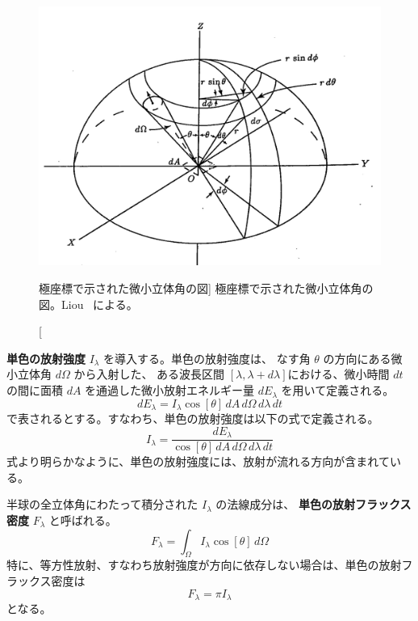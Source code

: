 \documentclass[book]{dennou777}
\newcommand{\hmemph}[1]{\textbf{#1}}
\begin{document}
\begin{figure}[t]
	\includegraphics[width=\linewidth]{eq2.jpg}
	\caption
	[極座標で示された微小立体角の図]
	{極座標で示された微小立体角の図。Liou~\cite{liou} による。}
\end{figure}

\hmemph{単色の放射強度} \(I_\lambda\) を導入する。単色の放射強度は、
なす角 \(\theta\) の方向にある微小立体角 \(d\Omega\) から入射した、
ある波長区間 \([\lambda,\lambda+d\lambda]\)における、微小時間 \(dt\)
の間に面積 \(dA\) を通過した微小放射エネルギー量 \(dE_\lambda\)
を用いて定義される。
\begin{equation}
	dE_\lambda=I_\lambda\cos[\theta]\,dA\,d\Omega\,d\lambda\,dt
\end{equation}
で表されるとする。すなわち、単色の放射強度は以下の式で定義される。
\begin{equation}
	I_\lambda=\frac{dE_\lambda}{\cos[\theta]\,dA\,d\Omega\,d\lambda\,dt}
\end{equation}
式より明らかなように、単色の放射強度には、放射が流れる方向が含まれている。

半球の全立体角にわたって積分された \(I_\lambda\) の法線成分は、
\hmemph{単色の放射フラックス密度} \(F_\lambda\) と呼ばれる。
\begin{equation}
	F_\lambda=\int_\Omega I_\lambda\cos[\theta]\,d\Omega
\end{equation}
特に、等方性放射、すなわち放射強度が方向に依存しない場合は、単色の放射フラックス密度は
\begin{equation}
	F_\lambda=\pi I_\lambda
\end{equation}
となる。
\end{document}
